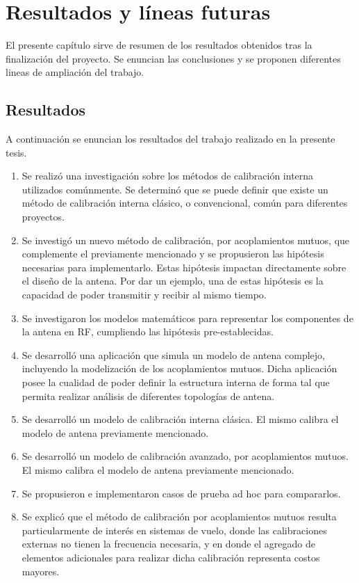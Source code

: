 \chapter{Resultados y líneas futuras}

El presente capítulo sirve de resumen de los resultados obtenidos tras la finalización del proyecto. Se enuncian las 
conclusiones y se proponen diferentes lineas de ampliación del trabajo.

\section{Resultados}

A continuación se enuncian los resultados del trabajo realizado en la presente tesis. 
\begin{enumerate}
	\item Se realizó una investigación sobre los métodos de calibración interna utilizados comúnmente. Se determinó que se puede
		definir que existe un método de calibración interna clásico, o convencional, común para diferentes proyectos.
	\item Se investigó un nuevo método de calibración, por acoplamientos mutuos, que complemente el previamente mencionado y se
		propusieron las hipótesis necesarias para implementarlo. Estas hipótesis impactan directamente sobre el diseño de la
		antena. Por dar un ejemplo, una de estas hipótesis es la capacidad de poder transmitir y recibir al mismo tiempo.
	\item Se investigaron los modelos matemáticos para representar los componentes de la antena en RF, cumpliendo las hipótesis
		pre-establecidas.
	\item Se desarrolló una aplicación que simula un modelo de antena complejo, incluyendo la modelización de los acoplamientos
		mutuos. Dicha aplicación posee la cualidad de poder definir la estructura interna de forma tal que permita realizar 
		análisis de diferentes topologías de antena.
	\item Se desarrolló un modelo de calibración interna clásica. El mismo calibra el modelo de antena previamente mencionado.
	\item Se desarrolló un modelo de calibración avanzado, por acoplamientos mutuos. El mismo calibra el modelo de antena
		previamente mencionado. 
	\item Se propusieron e implementaron casos de prueba ad hoc para compararlos.
	\item Se explicó que el método de calibración por acoplamientos mutuos resulta particularmente de interés en sistemas de
		vuelo, donde las calibraciones externas no tienen la frecuencia necesaria, y en donde el agregado de elementos
	adicionales para realizar dicha calibración representa costos mayores.
\end{enumerate}

